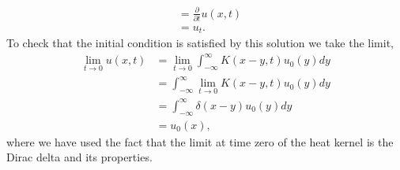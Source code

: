 \begin{questions}
\begin{solution}
\begin{align*}
&=\frac{\partial}{\partial t}u(x,t)\\
&=u_t.
\end{align*}
To check that the initial condition is satisfied by this solution we take the limit,
\begin{align*}
\lim_{t\to 0}u(x,t)&=\lim_{t\to 0}\int_{-\infty}^\infty K(x -y, t) u_0(y) dy\\
&=\int_{-\infty}^\infty \lim_{t\to 0}K(x -y, t) u_0(y) dy\\
&=\int_{-\infty}^\infty \delta(x-y) u_0(y) dy\\
&=u_0(x),
\end{align*}
where we have used the fact that the limit at time zero of the heat kernel is the Dirac delta and its properties.
\end{solution}
\end{questions}
